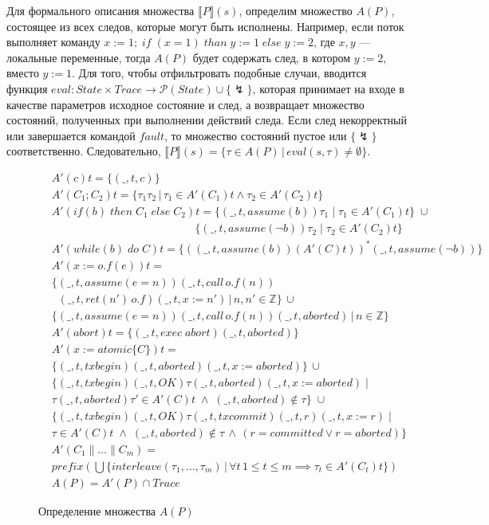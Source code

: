 Для формального описания множества $\llbracket P \rrbracket (s)$, определим множество $A(P)$, состоящее из всех следов, которые могут быть исполнены. Например, если поток выполняет команду $x := 1;\; if \; (x = 1) \; than \; y := 1 \; else \; y := 2$, где $x, y$ --- локальные переменные, тогда $A(P)$ будет содержать след, в котором $y := 2$, вместо $y := 1$. Для того, чтобы отфильтровать подобные случаи, вводится функция $eval: State \times Trace \to \mathcal{P}(State) \cup \{\lightning\}$, которая принимает на входе в качестве параметров исходное состояние и след, а возвращает множество состояний, полученных при выполнении действий следа. Если след некорректный или завершается командой $fault$, то множество состояний пустое или $\{\lightning\}$ соответственно. Следовательно, $\llbracket P \rrbracket (s) = \{\tau \in A(P) \, | \, eval(s,\tau) \neq \emptyset \}$.
\begin{figure}[t]
\begin{align*}
&A'(c)t = \{(\_, t, c)\} \\ 
&A'(C_1;C_2)t = \{\tau_1\tau_2 \,| \, \tau_1 \in A'(C_1)t \land \tau_2 \in A'(C_2)t \} \\
&A'(if \left (b \right) \; then \; C_1 \; else \; C_2)t = \{(\_, t, assume(b))\tau_1 \; | \; \tau_1 \in A'(C_1)t \} \; \cup \\
& \qquad \qquad \qquad \qquad \qquad \qquad \; \; \; \{ (\_, t, assume(\neg b))\tau_2 \; | \; \tau_2 \in A'(C_2)t\} \\
&A'(while \left (b \right) \; do \; C)t = \{ ((\_,t,assume(b))(A'(C)t))^*(\_,t,assume(\neg b)) \} \\
&A'(x := o.f(e))t = \\
&\{ (\_,t, assume(e =n))(\_, t, call \, o.f(n))\\
&\; \; (\_,t,ret(n') \, o.f)(\_,t,x:=n') \, | \, n, n' \in \mathbb{Z}\} \, \cup \\
&\{(\_,t,assume(e=n))(\_,t,call \, o.f(n))(\_,t,aborted) \, | \, n \in \mathbb{Z} \} \\
&A'(abort)t = \{ (\_, t, exec \; abort)(\_, t, aborted)\} \\
&A'(x:=atomic\{C\})t = \\
&\{ (\_,t,txbegin)(\_,t,aborted)(\_,t,x:= aborted) \} \, \cup  \\
&\{(\_,t,txbegin)(\_,t,OK)\tau(\_,t,aborted)(\_,t,x:= aborted) \; | \\
& \tau(\_,t,aborted)\tau' \in A'(C)t \; \land \; (\_,t,aborted) \notin \tau\} \; \cup \\ 
&\{(\_,t,txbegin)(\_,t,OK)\tau(\_,t,txcommit)(\_,t,r)(\_,t,x:= r) \; |\\ 
&\tau \in A'(C)t  \; \land \; (\_,t,aborted) \notin \tau \, \land \, (r = committed \lor r = aborted) \} \\
&A'(C_1 \parallel \ldots \parallel C_m) = \\ 
&prefix(\bigcup \{ interleave(\tau_1,\ldots, \tau_m) \, | \, \forall t \, 1 \leq t \leq m \implies \tau_t \in A'(C_t)t \}) \\
& A(P) = A'(P) \cap Trace
\end{align*}
 \caption{Определение множества $A(P)$}
\label{fig:actions}
\end{figure}

